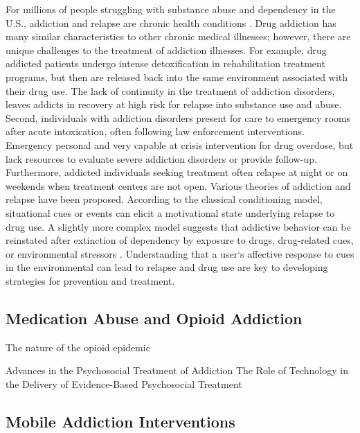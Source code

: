 \documentclass[sigconf]{acmart}
\begin{document}
For millions of people struggling with substance abuse and dependency in 
the U.S., addiction and relapse are chronic health conditions \cite{boyer10}. 
Drug addiction has many similar characteristics to other chronic medical 
illnesses; however, there are unique challenges to the treatment of addiction
illnesses. For example, drug addicted patients undergo intense detoxification 
in rehabilitation treatment programs, but then are released back into the same 
environment associated with their drug use. The lack of continuity in the 
treatment of addiction disorders, leaves addicts in recovery at high risk for
relapse into substance use and abuse. Second, individuals with addiction 
disorders present for care to emergency rooms after acute intoxication, often 
following law enforcement interventions. Emergency personal and very capable 
at crisis intervention for drug overdose, but lack resources to evaluate severe 
addiction disorders or provide follow-up. Furthermore, addicted individuals 
seeking treatment often relapse at night or on weekends when treatment centers 
are not open. Various theories of addiction and relapse have been proposed. 
According to the classical conditioning model, situational cues or events can 
elicit a motivational state underlying relapse to drug use. A slightly more 
complex model suggests that addictive behavior can be reinstated after 
extinction of dependency by exposure to drugs, drug-related cues, or 
environmental stressors \cite{shaham03}. Understanding that a user`s affective
response to cues in the environmental can lead to relapse and drug use are key 
to developing strategies for prevention and treatment. 


\subsection{Medication Abuse and Opioid Addiction}


The nature of the opioid epidemic

Advances in the Psychosocial Treatment of Addiction
The Role of Technology in the Delivery of Evidence-Based Psychosocial Treatment
\cite{marschdallery2012}


\subsection{Mobile Addiction Interventions}
\end{document}
